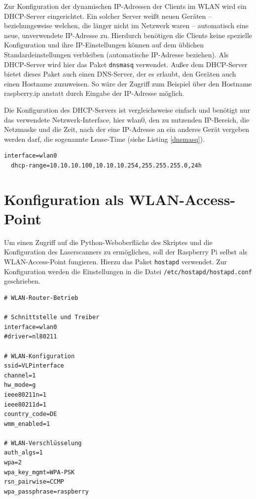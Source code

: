 \documentclass[a4paper,12pt,bibliography=totoc, listof=totoc,titlepage]{scrreprt}
\newcommand{\code}[1]{\texttt{#1}}
\begin{document}
Zur Konfiguration der dynamischen IP-Adressen der Clients im WLAN wird ein DHCP-Server eingerichtet. Ein solcher Server weißt neuen Geräten -- beziehungsweise welchen, die länger nicht im Netzwerk waren -- automatisch eine neue, unverwendete IP-Adresse zu. Hierdurch benötigen die Clients keine spezielle Konfiguration und ihre IP-Einstellungen können auf dem üblichen Standardeinstellungen verbleiben (automatische IP-Adresse beziehen). Als DHCP-Server wird hier das Paket \code{dnsmasq} verwendet. Außer dem DHCP-Server bietet dieses Paket auch einen DNS-Server, der es erlaubt, den Geräten auch einen Hostname zuzuweisen. So wäre der Zugriff zum Beispiel über den Hostname raspberry.ip anstatt durch Eingabe der IP-Adresse möglich.

Die Konfiguration des DHCP-Servers ist vergleichsweise einfach und benötigt nur das verwendete Netzwerk-Interface, hier wlan0, den zu nutzenden IP-Bereich, die Netzmaske und die Zeit, nach der eine IP-Adresse an ein anderes Gerät vergeben werden darf, die sogenannte Lease-Time (siehe Listing \ref{dnsmasq}). \cite{accesspoint}

  
\begin{lstlisting}[caption={Konfiguration der \code{/etc/dnsmasq.conf}}, label={dnsmasq}]
interface=wlan0
  dhcp-range=10.10.10.100,10.10.10.254,255.255.255.0,24h
\end{lstlisting}

\section{Konfiguration als WLAN-Access-Point}
Um einen Zugriff auf die Python-Weboberfläche des Skriptes und die Konfiguration des Laserscanners zu ermöglichen, soll der Raspberry Pi selbst als WLAN-Access-Point fungieren. Hierzu das Paket \code{hostapd} verwendet. Zur Konfiguration werden die Einstellungen in die Datei \code{/etc/hostapd/hostapd.conf} geschrieben. \cite{accesspoint}

\begin{lstlisting}[caption={Konfiguration der \code{/etc/hostapd/hostapd.conf}}, label={hostapd}]
# WLAN-Router-Betrieb

# Schnittstelle und Treiber
interface=wlan0
#driver=nl80211

# WLAN-Konfiguration
ssid=VLPinterface
channel=1
hw_mode=g
ieee80211n=1
ieee80211d=1
country_code=DE
wmm_enabled=1

# WLAN-Verschlüsselung
auth_algs=1
wpa=2
wpa_key_mgmt=WPA-PSK
rsn_pairwise=CCMP
wpa_passphrase=raspberry
\end{lstlisting}
\end{document}
